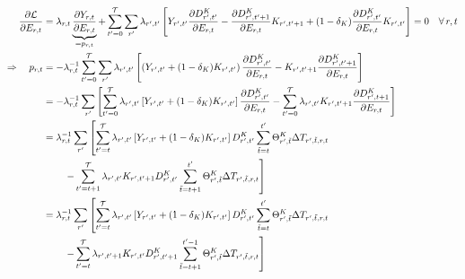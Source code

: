 \documentclass[preprint,3p,authoryear]{elsarticle}
\begin{document}
\begin{align}
  \label{eq:partE}
  \frac{\partial\mcL}{\partial E_{r,t}} &= \lambda_{r,t}\underbrace{\frac{\partial Y_{r,t}}{\partial E_{r,t}}}_{=p_{r,t}}+ \sum_{t'=0}^{\T}\sum_{r'}\lambda_{r',t'}\left[Y_{r',t'}\frac{\partial \DK_{r',t'}}{\partial E_{r,t}}-\pf{\DK_{r',t'+1}}{E_{r,t}}K_{r',t'+1}+(1-\delta_K)\pf{\DK_{r',t'}}{E_{r,t}}K_{r',t'}\right]=0\quad\forall\,r,t\notag\\
  \Rightarrow \quad p_{r,t} &= -\lambda_{r,t}^{-1}\sum_{t'=0}^{\T}\sum_{r'}\lambda_{r',t'}\left[\left(Y_{r',t'}+(1-\delta_K)K_{r',t'}\right)\pf{\DK_{r',t'}}{ E_{r,t}}-K_{r',t'+1}\pf{\DK_{r',t'+1}}{E_{r,t}}\right]\notag\\
                                        &=                                          -\lambda_{r,t}^{-1}\sum_{r'}\left[\sum_{t'=0}^{\T}\lambda_{r',t'}\left[Y_{r',t'}+(1-\delta_K)K_{r',t'}\right]\pf{\DK_{r',t'}}{ E_{r,t}}- \sum_{t'=0}^{\T} \lambda_{r',t'}K_{r',t'+1}\pf{\DK_{r',t+1}}{E_{r,t}}\right]\notag\\
                                        &=                                          \lambda_{r,t}^{-1}\sum_{r'}\left[\sum_{t'=t}^{\T}\lambda_{r',t'}\left[Y_{r',t'}+(1-\delta_K)K_{r',t'}\right]\DK_{r',t'}\sum_{\tilde{t}=t}^{t'}\Theta^{K}_{r',\tilde{t}}\Delta T_{r',\tilde{t},r,t}\right.\\
                                        &\qquad\,\left.-\sum_{t'=t+1}^{\T}\lambda_{r',t'}K_{r',t'+1}\DK_{r',t'}\sum_{\tilde{t}=t+1}^{t'}\Theta^{K}_{r',\tilde{t}}\Delta T_{r',\tilde{t},r,t}\right]\notag\\
  &=
\lambda_{r,t}^{-1}\sum_{r'}\left[\sum_{t'=t}^{\T}\lambda_{r',t'}\left[Y_{r',t'}+(1-\delta_K)K_{r',t'}\right]\DK_{r',t'}\sum_{\tilde{t}=t}^{t'}\Theta^{K}_{r',\tilde{t}}\Delta T_{r',\tilde{t},r,t}\right.\\ &\qquad\,\left.-\sum_{t'=t}^{\T}\lambda_{r',t'+1}K_{r',t'}\DK_{r',t'+1}\sum_{\tilde{t}=t+1}^{t'-1}\Theta^{K}_{r',\tilde{t}}\Delta T_{r',\tilde{t},r,t}\right]\notag\\                                         %

\end{align}
\end{document}
